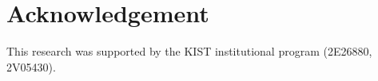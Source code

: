 \documentclass[10pt]{article}
\begin{document}
\section*{Acknowledgement}
This research was supported by the KIST institutional program (2E26880, 2V05430).


\newpage


\end{document}
